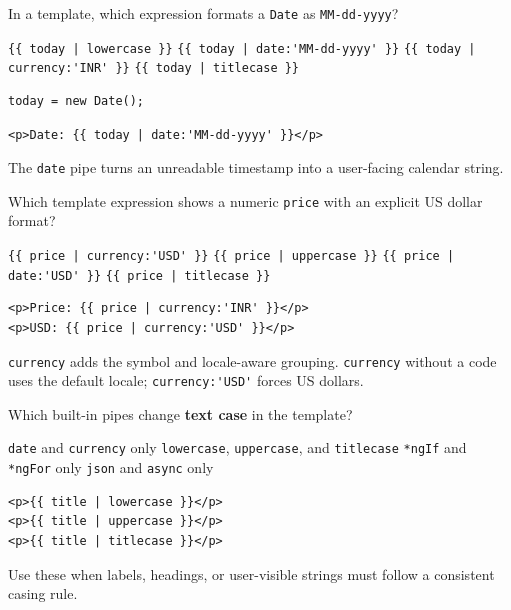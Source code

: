 \question[4]
In a template, which expression formats a \texttt{Date} as \texttt{MM-dd-yyyy}?
\begin{choices}
  \choice \lstinline[style=htmlinline]!{{ today | lowercase }}!
  \CorrectChoice \lstinline[style=htmlinline]!{{ today | date:'MM-dd-yyyy' }}!
  \choice \lstinline[style=htmlinline]!{{ today | currency:'INR' }}!
  \choice \lstinline[style=htmlinline]!{{ today | titlecase }}!
\end{choices}
\begin{solution}
\begin{lstlisting}[style=ts]
today = new Date();
\end{lstlisting}
\begin{lstlisting}[style=htmlinline]
<p>Date: {{ today | date:'MM-dd-yyyy' }}</p>
\end{lstlisting}
  The \lstinline[style=htmlinline]|date| pipe turns an unreadable timestamp into a user-facing calendar string.
\end{solution}

\question[4]
Which template expression shows a numeric \texttt{price} with an explicit US dollar format?
\begin{choices}
  \CorrectChoice \lstinline[style=htmlinline]!{{ price | currency:'USD' }}!
  \choice \lstinline[style=htmlinline]!{{ price | uppercase }}!
  \choice \lstinline[style=htmlinline]!{{ price | date:'USD' }}!
  \choice \lstinline[style=htmlinline]!{{ price | titlecase }}!
\end{choices}
\begin{solution}
\begin{lstlisting}[style=htmlinline]
<p>Price: {{ price | currency:'INR' }}</p>
<p>USD: {{ price | currency:'USD' }}</p>
\end{lstlisting}
  \lstinline[style=htmlinline]|currency| adds the symbol and locale-aware grouping. \lstinline[style=htmlinline]|currency| without a code uses the default locale; \lstinline[style=htmlinline]|currency:'USD'| forces US dollars.
\end{solution}

\question[4]
Which built-in pipes change \textbf{text case} in the template?
\begin{choices}
  \choice \lstinline[style=htmlinline]|date| and \lstinline[style=htmlinline]|currency| only
  \CorrectChoice \lstinline[style=htmlinline]|lowercase|, \lstinline[style=htmlinline]|uppercase|, and \lstinline[style=htmlinline]|titlecase|
  \choice \lstinline[style=htmlinline]|*ngIf| and \lstinline[style=htmlinline]|*ngFor| only
  \choice \lstinline[style=htmlinline]|json| and \lstinline[style=htmlinline]|async| only
\end{choices}
\begin{solution}
\begin{lstlisting}[style=htmlinline]
<p>{{ title | lowercase }}</p>
<p>{{ title | uppercase }}</p>
<p>{{ title | titlecase }}</p>
\end{lstlisting}
  Use these when labels, headings, or user-visible strings must follow a consistent casing rule.
\end{solution}

